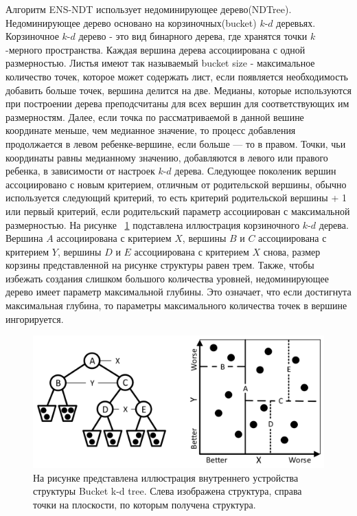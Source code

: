 Алгоритм ENS-NDT использует недоминирующее дерево(NDTree). Недоминирующее дерево основано на корзиночных(bucket) $k$-$d$ деревьях. Корзиночное $k$-$d$ дерево - это вид бинарного дерева, где хранятся точки $k$-мерного пространства. Каждая вершина дерева ассоциирована с одной размерностью. Листья имеют так называемый bucket size - максимальное количество точек, которое может содержать лист, если появляется необходимость добавить больше точек, вершина делится на две. Медианы, которые используются при построении дерева преподсчитаны для всех вершин для соответствующих им размерностям. Далее, если точка по рассматриваемой в данной вешине координате меньше, чем медианное значение, то процесс добавления продолжается в левом ребенке-вершине, если больше {---} то в правом. Точки, чьи координаты равны медианному значению, добавляются в левого или правого ребенка, в зависимости от настроек $k$-$d$ дерева. Следующее поколеник вершин ассоциировано с новым критерием, отличным от родительской вершины, обычно используется следующий критерий, то есть критерий родительской вершины + 1 или первый критерий, если родительский параметр ассоциирован с максимальной размерностью.  На рисунке ~\ref{ndt_explanation} подставлена иллюстрация корзиночного $k$-$d$ дерева. Вершина $A$ ассоциирована с критерием $X$, вершины $B$ и $C$ ассоциирована с критерием $Y$, вершины $D$ и $E$ ассоциирована с критерием $X$ снова, размер корзины представленной на рисунке структуры равен трем. Также, чтобы избежать создания слишком большого количества уровней, недоминирующее дерево имеет параметр максимальной глубины. Это означает, что если достигнута максимальная глубина, то параметры максимального количества точек в вершине ингорируется.

\begin{figure}[!h]
\begin{center}
\includegraphics[width=15cm]{pic/ndt_explanation.png}
\caption{На рисунке представлена иллюстрация внутреннего устройства структуры Bucket k-d tree. Слева изображена структура, справа точки на плоскости, по которым получена структура.}
\label{ndt_explanation}
\end{center}
\end{figure}

